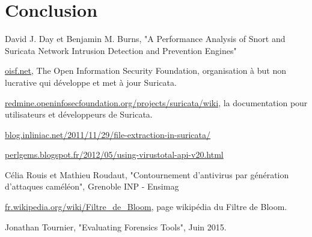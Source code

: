 \documentclass[smallextended]{svjour3}       %
\begin{document}
\section{Conclusion}
\label{2.3ids}

\begin{thebibliography}{}
%

David J. Day et Benjamin M. Burns, "A Performance Analysis of Snort and Suricata Network Intrusion Detection and Prevention Engines"

\url{oisf.net}, The Open Information Security Foundation, organisation à but non lucrative qui développe et met à jour Suricata.

\url{redmine.openinfosecfoundation.org/projects/suricata/wiki}, la documentation pour utilisateurs et développeurs de Suricata.

\url{blog.inliniac.net/2011/11/29/file-extraction-in-suricata/}

\url{perlgems.blogspot.fr/2012/05/using-virustotal-api-v20.html}

Célia Rouis et Mathieu Roudaut, "Contournement d'antivirus par génération d'attaques caméléon", Grenoble INP - Ensimag

\url{fr.wikipedia.org/wiki/Filtre_de_Bloom}, page wikipédia du Filtre de Bloom.

Jonathan Tournier, "Evaluating Forensics Tools", Juin 2015.


\end{thebibliography}
\end{document}
